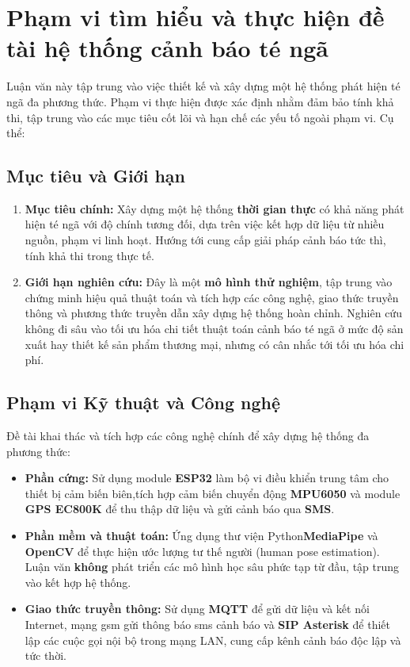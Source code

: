 
\section{Phạm vi tìm hiểu và thực hiện đề tài hệ thống cảnh báo té ngã}

Luận văn này tập trung vào việc thiết kế và xây dựng một hệ thống phát hiện té ngã đa phương thức. Phạm vi thực hiện được xác định nhằm đảm bảo tính khả thi, tập trung vào các mục tiêu cốt lõi và hạn chế các yếu tố ngoài phạm vi. Cụ thể:

\subsection{Mục tiêu và Giới hạn}
\begin{enumerate}
    \item \textbf{Mục tiêu chính:} Xây dựng một hệ thống \textbf{thời gian thực} có khả năng phát hiện té ngã với độ chính tương đối, dựa trên việc kết hợp dữ liệu từ nhiều nguồn, phạm vi linh hoạt. Hướng tới cung cấp giải pháp cảnh báo tức thì, tính khả thi trong thực tế.
    
    \item \textbf{Giới hạn nghiên cứu:} Đây là một \textbf{mô hình thử nghiệm}, tập trung vào chứng minh hiệu quả thuật toán và tích hợp các công nghệ, giao thức truyền thông và phương thức truyền dẫn xây dựng hệ thống hoàn chỉnh. Nghiên cứu không đi sâu vào tối ưu hóa chi tiết thuật toán cảnh báo té ngã ở mức độ sản xuất hay thiết kế sản phẩm thương mại, nhưng có cân nhắc tới tối ưu hóa chi phí.
\end{enumerate}

\subsection{Phạm vi Kỹ thuật và Công nghệ}
Đề tài khai thác và tích hợp các công nghệ chính để xây dựng hệ thống đa phương thức:
\begin{itemize}
    \item \textbf{Phần cứng:} Sử dụng module \textbf{ESP32} làm bộ vi điều khiển trung tâm cho thiết bị cảm biến biên,tích hợp cảm biến chuyển động \textbf{MPU6050} và module \textbf{GPS EC800K} để thu thập dữ liệu và gửi cảnh báo qua \textbf{SMS}.
    
    \item \textbf{Phần mềm và thuật toán:} Ứng dụng thư viện  Python\textbf{MediaPipe} và \textbf{OpenCV} để thực hiện ước lượng tư thế người (human pose estimation). Luận văn \textbf{không} phát triển các mô hình học sâu phức tạp từ đầu, tập trung vào kết hợp hệ thống.
    
    \item \textbf{Giao thức truyền thông:} Sử dụng \textbf{MQTT} để gửi dữ liệu và kết nối Internet, mạng gsm gửi thông báo sms cảnh báo và \textbf{SIP Asterisk} để thiết lập các cuộc gọi nội bộ trong mạng LAN, cung cấp kênh cảnh báo độc lập và tức thời.
\end{itemize}

